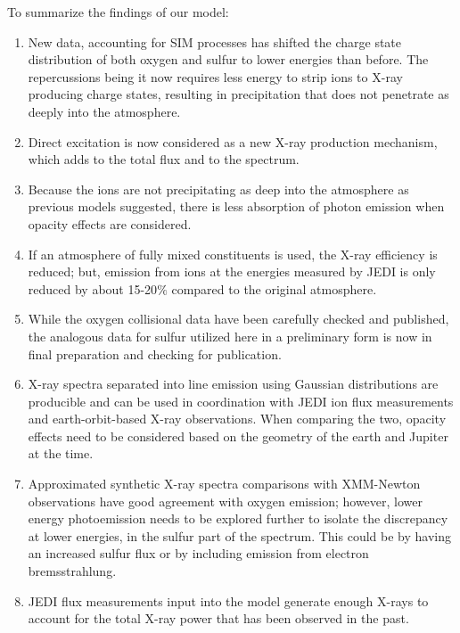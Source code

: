 \documentclass[draft]{agujournal2018}
\begin{document}
To summarize the findings of our model:
\begin{enumerate}
    \item New data, accounting for SIM processes has shifted the charge state distribution of both oxygen and sulfur to lower energies than before.
    The repercussions being it now requires less energy to strip ions to X-ray producing charge states, resulting in precipitation that does not penetrate as deeply into the atmosphere.
    \item Direct excitation is now considered as a new X-ray production mechanism, which adds to the total flux and to the spectrum.
    \item Because the ions are not precipitating as deep into the atmosphere as previous models suggested, there is less absorption of photon emission when opacity effects are considered.
    \item If an atmosphere of fully mixed constituents is used, the X-ray efficiency is reduced; but, emission from ions at the energies measured by JEDI is only reduced by about 15-20$\%$ compared to the original atmosphere.
    \item While the oxygen collisional data have been carefully checked and published, the analogous data for sulfur utilized here in a preliminary form is now in final preparation and checking for publication.
    \item X-ray spectra separated into line emission using Gaussian distributions are producible and can be used in coordination with JEDI ion flux measurements and earth-orbit-based X-ray observations.
    When comparing the two, opacity effects need to be considered based on the geometry of the earth and Jupiter at the time.
    \item Approximated synthetic X-ray spectra comparisons with XMM-Newton observations have good agreement with oxygen emission; however, lower energy photoemission needs to be explored further to isolate the discrepancy at lower energies, in the sulfur part of the spectrum.
    This could be by having an increased sulfur flux or by including emission from electron bremsstrahlung.
    \item JEDI flux measurements input into the model generate enough X-rays to account for the total X-ray power that has been observed in the past.
\end{enumerate}
\end{document}
